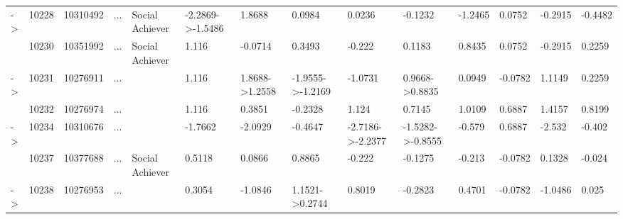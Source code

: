 \documentclass[6pt,a4paper]{article}
\begin{document}
\begin{landscape}
{\begin{longtable}{llllllllllllll}
-\textgreater &10228&10310492&...&Social Achiever&-2.2869-\textgreater -1.5486&1.8688&0.0984&0.0236&-0.1232&-1.2465&0.0752&-0.2915&-0.4482\tabularnewline
&10230&10351992&...&Social Achiever&1.116&-0.0714&0.3493&-0.222&0.1183&0.8435&0.0752&-0.2915&0.2259\tabularnewline
-\textgreater &10231&10276911&...&&1.116&1.8688-\textgreater 1.2558&-1.9555-\textgreater -1.2169&-1.0731&0.9668-\textgreater 0.8835&0.0949&-0.0782&1.1149&0.2259\tabularnewline
&10232&10276974&...&&1.116&0.3851&-0.2328&1.124&0.7145&1.0109&0.6887&1.4157&0.8199\tabularnewline
-\textgreater &10234&10310676&...&&-1.7662&-2.0929&-0.4647&-2.7186-\textgreater -2.2377&-1.5282-\textgreater -0.8555&-0.579&0.6887&-2.532&-0.402\tabularnewline
&10237&10377688&...&Social Achiever&0.5118&0.0866&0.8865&-0.222&-0.1275&-0.213&-0.0782&0.1328&-0.024\tabularnewline
-\textgreater &10238&10276953&...&&0.3054&-1.0846&1.1521-\textgreater 0.2744&0.8019&-0.2823&0.4701&-0.0782&-1.0486&0.025\tabularnewline
\hline
\end{longtable}}

\end{landscape}
\end{document}
